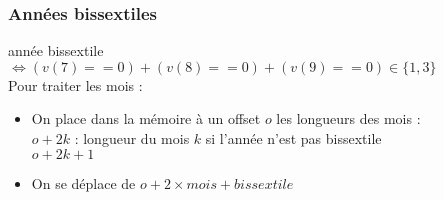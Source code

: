 \documentclass{beamer}
\begin{document}
	\begin{frame}
		\frametitle{Années bissextiles}
		année bissextile $\Leftrightarrow (v(7)==0) + (v(8) ==0) +
		(v(9)==0) \in \{1,3\}$\\
		\pause
		\vspace{1cm}
		Pour traiter les mois :
		\pause
		\begin{itemize}
			\item On place dans la mémoire à un offset $o$ les longueurs
				des mois :\pause \\
				$o + 2k$ : longueur du mois $k$ si l'année n'est pas bissextile\\
				\pause $o + 2k + 1$
				\pause
			\item On se déplace de $o + 2\times mois + bissextile$
				
		\end{itemize}
	\end{frame}
\end{document}
